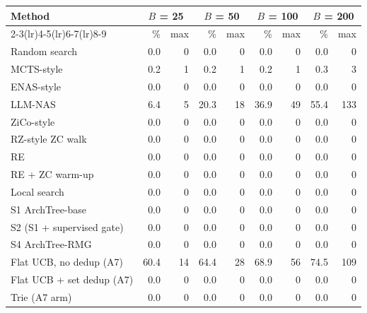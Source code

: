 \begin{tabular}{@{}lrrrrrrrr@{}}
\toprule
\multirow{2}{*}{Method} & \multicolumn{2}{c}{$B$ = 25} & \multicolumn{2}{c}{$B$ = 50} & \multicolumn{2}{c}{$B$ = 100} & \multicolumn{2}{c}{$B$ = 200}\\
\cmidrule(lr){2-3}\cmidrule(lr){4-5}\cmidrule(lr){6-7}\cmidrule(lr){8-9}
 & \% & max & \% & max & \% & max & \% & max\\
\midrule
Random search & 0.0 & 0 & 0.0 & 0 & 0.0 & 0 & 0.0 & 0\\
MCTS-style & 0.2 & 1 & 0.2 & 1 & 0.2 & 1 & 0.3 & 3\\
ENAS-style & 0.0 & 0 & 0.0 & 0 & 0.0 & 0 & 0.0 & 0\\
LLM-NAS & 6.4 & 5 & 20.3 & 18 & 36.9 & 49 & 55.4 & 133\\
ZiCo-style & 0.0 & 0 & 0.0 & 0 & 0.0 & 0 & 0.0 & 0\\
RZ-style ZC walk & 0.0 & 0 & 0.0 & 0 & 0.0 & 0 & 0.0 & 0\\
RE & 0.0 & 0 & 0.0 & 0 & 0.0 & 0 & 0.0 & 0\\
RE + ZC warm-up & 0.0 & 0 & 0.0 & 0 & 0.0 & 0 & 0.0 & 0\\
Local search & 0.0 & 0 & 0.0 & 0 & 0.0 & 0 & 0.0 & 0\\
S1 ArchTree-base & 0.0 & 0 & 0.0 & 0 & 0.0 & 0 & 0.0 & 0\\
S2 (S1 + supervised gate) & 0.0 & 0 & 0.0 & 0 & 0.0 & 0 & 0.0 & 0\\
S4 ArchTree-RMG & 0.0 & 0 & 0.0 & 0 & 0.0 & 0 & 0.0 & 0\\
Flat UCB, no dedup (A7) & 60.4 & 14 & 64.4 & 28 & 68.9 & 56 & 74.5 & 109\\
Flat UCB + set dedup (A7) & 0.0 & 0 & 0.0 & 0 & 0.0 & 0 & 0.0 & 0\\
Trie (A7 arm) & 0.0 & 0 & 0.0 & 0 & 0.0 & 0 & 0.0 & 0\\
\bottomrule
\end{tabular}
